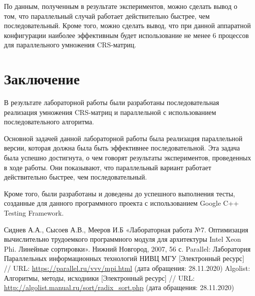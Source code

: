 \documentclass{report}
\begin{document}
\par По данным, полученным в результате экспериментов, можно сделать вывод о том, что параллельный случай работает действительно быстрее, чем последовательный. Кроме того, можно сделать вывод, что при данной аппаратной конфигурации наиболее эффективным будет использование не менее 6 процессов для параллельного умножения CRS-матриц.
\newpage

\section*{Заключение}
В результате лабораторной работы были разработаны последовательная реализация умножения CRS-матриц и параллельной с использованием последовательного алгоритма.
\par Основной задачей данной лабораторной работы была реализация параллельной версии, которая должна была быть эффективнее последовательной. Эта задача была успешно достигнута, о чем говорят результаты экспериментов, проведенных в ходе работы. Они показывают, что параллельный вариант работает действительно быстрее, чем последовательный.
\par Кроме того, были разработаны и доведены до успешного выполнения тесты, созданные для данного программного проекта с использованием Google C++ Testing Framework.
\newpage

\begin{thebibliography}{1}
 Сиднев А.А., Сысоев А.В., Мееров И.Б «Лабораторная работа №7. Оптимизация вычислительно трудоемкого программного модуля для архитектуры Intel Xeon Phi. Линейные сортировки». Нижний Новгород, 2007, 56 с. 
 Parallel: Лаборатория Параллельных информационных технологий НИВЦ МГУ [Электронный ресурс] // URL: \url {https://parallel.ru/vvv/mpi.html} (дата обращения: 28.11.2020)
 Algolist: Алгоритмы, методы, исходники [Электронный ресурс] // URL: \url {http://algolist.manual.ru/sort/radix_sort.php} (дата обращения: 28.11.2020)
\end{thebibliography}
\newpage

\end{document}
